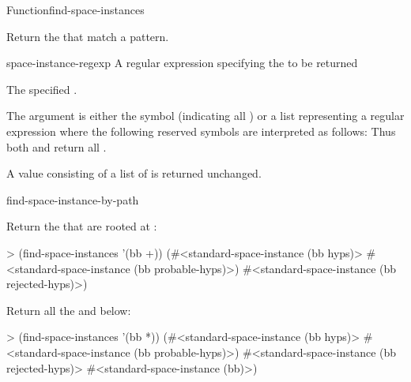 \documentclass[10pt,twoside,english,pdftex]{article}
\begin{document}
\begin{functiondoc}{Function}{find-space-instances}%
  { \returns{} }

\fnsyntax

\fnpurpose Return the  that match a
 pattern.

\fnpackage {}

\fnmodule {}

\fnargs
\begin{args}{space-instance-regexp}
 A  regular expression
specifying the  to be returned 
\end{args}

\fnreturns The specified .

\fndescription 
{}%
The  argument is either the symbol
 (indicating all ) or a list
representing a regular expression where the following reserved symbols
are interpreted as follows: 
\spaceinstanceregexp
Thus both  and
 return all .

A  value consisting of a list of
 is returned unchanged.

\begin{alsos}{find-space-instance-by-path}
\end{alsos}

\fnexamples
Return the  that are rooted at :
\begin{example}
> (find-space-instances '(bb +))
(#<standard-space-instance (bb hyps)>
 #<standard-space-instance (bb probable-hyps)>)
 #<standard-space-instance (bb rejected-hyps)>)
\end{example}

Return all the   and below:
\begin{example}
> (find-space-instances '(bb *))
(#<standard-space-instance (bb hyps)>
 #<standard-space-instance (bb probable-hyps)>)
 #<standard-space-instance (bb rejected-hyps)>
 #<standard-space-instance (bb)>)
\end{example}

\end{functiondoc}
\end{document}
